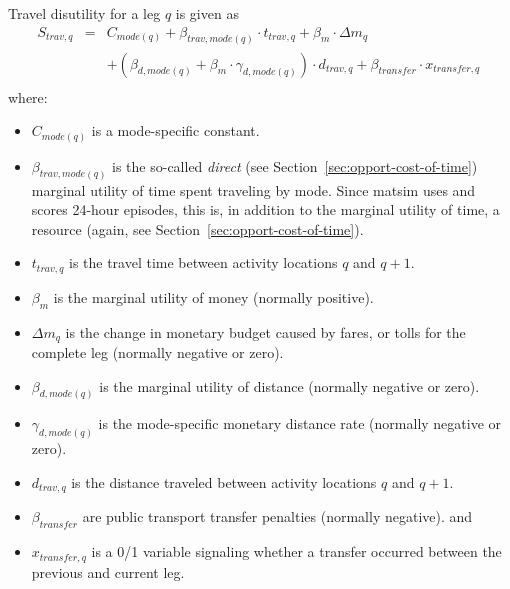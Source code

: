 
Travel disutility for a leg $q$ is given as 
\begin{equation}
\label{eq:tdisutility}
\begin{matrix}
S_{trav, q} & = & C_{mode(q)} + \beta_{trav, mode(q)} \cdot t_{trav, q} + \beta_{m} \cdot \Delta m_q \\
& & + (\beta_{d, mode(q)} + \beta_{m} \cdot \gamma_{d, mode(q)}) \cdot d_{trav,q} 
%
+ \beta_{transfer} \cdot x_{transfer,q} \, \\
\end{matrix}
\end{equation} 
where:
%
\begin{itemize}\styleItemize

\item $C_{mode(q)}$ is a mode-specific constant.

\item $\beta_{trav, mode(q)}$ is the so-called \emph{direct} (see Section~\ref{sec:opport-cost-of-time}) marginal utility of time spent traveling by mode.  Since \gls{matsim} uses and scores 24-hour episodes, this is, in addition to the marginal utility of time, a resource (again, see Section~\ref{sec:opport-cost-of-time}).


\item $t_{trav, q}$ is the travel time between activity locations $q$ and $q+1$.

\item $\beta_{m}$ is the marginal utility of money (normally positive).

\item $\Delta m_q$ is the change in monetary budget caused by fares, or tolls for the complete leg (normally negative or zero).
\item $\beta_{d, mode(q)}$ is the  marginal utility of distance (normally negative or zero).
\item $\gamma_{d, mode(q)}$ is the mode-specific monetary distance rate (normally negative or zero).
\item $d_{trav, q}$ is the distance traveled between activity locations $q$ and $q+1$.
\item $\beta_{transfer}$ are public transport transfer penalties (normally negative).
and
\item $x_{transfer,q}$ is a 0/1 variable signaling whether a transfer occurred between the previous and current leg.
\end{itemize}
